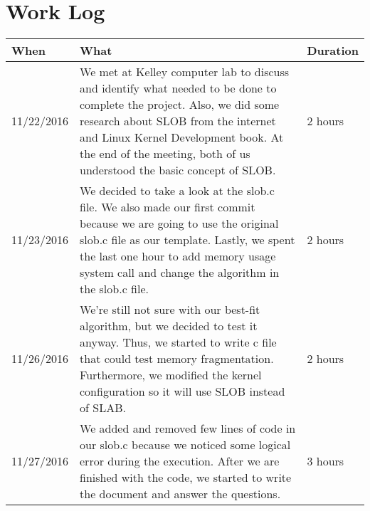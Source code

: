 \documentclass[letterpaper,10pt,draftclsnofoot,titlepage,onecolumn]{IEEEtran}
\begin{document}
\section{Work Log}
\begin{center}
\begin{tabular}{ |m{2cm}|m{10cm}|m{2cm}| }
\hline
When & What & Duration \\ \hline
11/22/2016
& We met at Kelley computer lab to discuss and identify what needed to be done to complete the project. 
Also, we did some research about SLOB from the internet and Linux Kernel Development book.
At the end of the meeting, both of us understood the basic concept of SLOB.
& 2 hours\\ 
\hline

11/23/2016 
& We decided to take a look at the slob.c file. 
We also made our first commit because we are going to use the original slob.c file as our template.
Lastly, we spent the last one hour to add memory usage system call and change the algorithm in the slob.c file.
& 2 hours\\ 
\hline

11/26/2016 
& We're still not sure with our best-fit algorithm, but we decided to test it anyway. 
Thus, we started to write c file that could test memory fragmentation. 
Furthermore, we modified the kernel configuration so it will use SLOB instead of SLAB.
& 2 hours\\ 
\hline

11/27/2016 
& We added and removed few lines of code in our slob.c because we noticed some logical error
during the execution.
After we are finished with the code, we started to write the document and answer the questions.
& 3 hours\\ 
\hline

\end{tabular}
\end{center}
\end{document}
